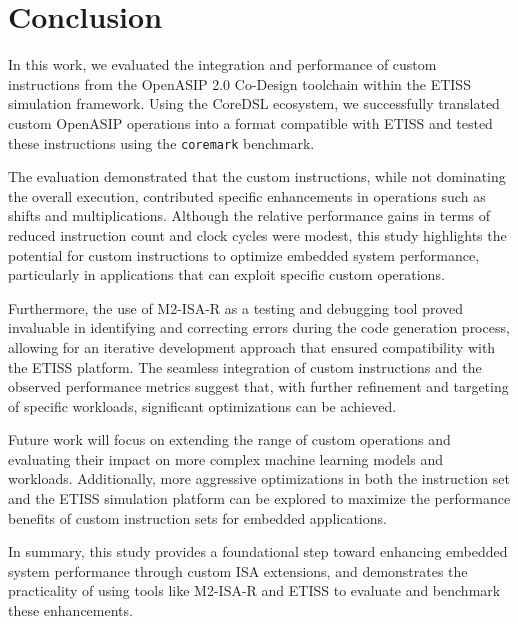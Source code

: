 \section{Conclusion}

In this work, we evaluated the integration and performance of custom instructions from the OpenASIP 2.0 Co-Design toolchain within the ETISS simulation framework. Using the CoreDSL ecosystem, we successfully translated custom OpenASIP operations into a format compatible with ETISS and tested these instructions using the \texttt{coremark} benchmark.

The evaluation demonstrated that the custom instructions, while not dominating the overall execution, contributed specific enhancements in operations such as shifts and multiplications. Although the relative performance gains in terms of reduced instruction count and clock cycles were modest, this study highlights the potential for custom instructions to optimize embedded system performance, particularly in applications that can exploit specific custom operations.

Furthermore, the use of M2-ISA-R as a testing and debugging tool proved invaluable in identifying and correcting errors during the code generation process, allowing for an iterative development approach that ensured compatibility with the ETISS platform. The seamless integration of custom instructions and the observed performance metrics suggest that, with further refinement and targeting of specific workloads, significant optimizations can be achieved.

Future work will focus on extending the range of custom operations and evaluating their impact on more complex machine learning models and workloads. Additionally, more aggressive optimizations in both the instruction set and the ETISS simulation platform can be explored to maximize the performance benefits of custom instruction sets for embedded applications.

In summary, this study provides a foundational step toward enhancing embedded system performance through custom ISA extensions, and demonstrates the practicality of using tools like M2-ISA-R and ETISS to evaluate and benchmark these enhancements.